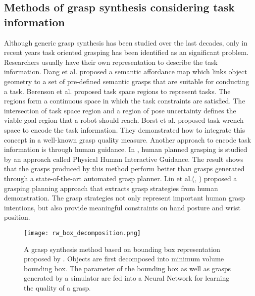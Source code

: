 \subsection{Methods of grasp synthesis considering task information}
Although generic grasp synthesis has been studied over the last decades, only in recent years task oriented grasping has been identified as an significant problem. Researchers usually have their own representation to describe the task information. Dang et al.\cite{Dang2012} proposed a semantic affordance map which links object geometry to a set of pre-defined semantic grasps that are suitable for conducting a task.  Berenson et al.\cite{Berenson2009} proposed task space regions to represent tasks. The regions form a continuous space in which the task constraints are satisfied. The intersection of task space region and a region of pose uncertainty defines the viable goal region that a robot should reach. Borst et al.\cite{Borst2004} proposed task wrench space to encode the task information. They demonstrated how to integrate this concept in a well-known grasp quality measure. Another approach to encode task information is through human guidance. In \cite{Balasubramanian2014}, human planned grasping is studied by an approach called Physical Human Interactive Guidance. The result shows that the grasps produced by this method perform better than grasps generated through a state-of-the-art automated grasp planner. Lin et al.(\cite{Lin2015},  \cite{Lin2014}) proposed a grasping planning approach that extracts grasp strategies from human demonstration. The grasp strategies not only represent important human grasp intentions, but also provide meaningful constraints on hand posture and wrist position. 
\begin{figure}[!htbp]
\centering
\texttt{[image: rw\_box\_decomposition.png]}
\captionsetup{justification=raggedright}
\caption{A grasp synthesis method based on bounding box representation proposed by \cite{Huebner2009}. Objects are first decomposed into minimum volume bounding box. The parameter of the bounding box as well as grasps generated by a simulator are fed into a Neural Network for learning the quality of a grasp. }
\label{fig:rw_box_decomposition}       %
\end{figure} 
